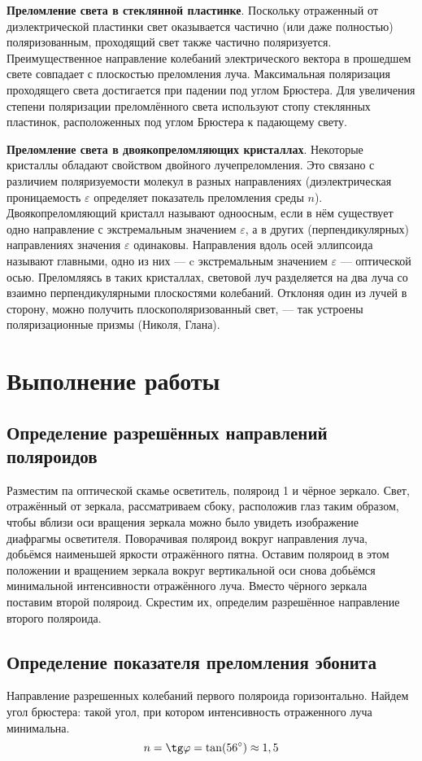 \documentclass[a4paper, 12pt]{article}
\begin{document}
	\textbf{Преломление света в стеклянной пластинке}. Поскольку отраженный от
	диэлектрической пластинки свет оказывается частично (или даже полностью) поляризованным, проходящий свет также частично поляризуется. Преимущественное направление колебаний электрического вектора
	в прошедшем свете совпадает с плоскостью преломления луча. Максимальная поляризация проходящего света достигается при падении под
	углом Брюстера. Для увеличения степени поляризации преломлённого
	света используют стопу стеклянных пластинок, расположенных под углом Брюстера к падающему свету.
	
	\textbf{Преломление света в двоякопреломляющих кристаллах}. Некоторые кристаллы обладают свойством двойного лучепреломления. Это связано с различием поляризуемости молекул в разных направлениях (диэлектрическая проницаемость $\varepsilon$ определяет показатель преломления среды $n$).
	Двоякопреломляющий кристалл называют одноосным, если в нём существует одно направление с экстремальным значением $\varepsilon$, а в других (перпендикулярных) направлениях значения $\varepsilon$ одинаковы. Направления вдоль осей эллипсоида называют главными, одно из них --- c экстремальным значением $\varepsilon$ --- оптической осью. Преломляясь в таких кристаллах, световой луч разделяется на два луча со взаимно перпендикулярными плоскостями колебаний. Отклоняя	один из лучей в сторону, можно получить плоскополяризованный свет, --- так устроены поляризационные призмы (Николя, Глана).

\section{Выполнение работы}
\subsection{Определение разрешённых направлений поляроидов}
Разместим па оптической скамье осветитель, поляроид 1 и чёрное зеркало. Свет, отражённый от зеркала, рассматриваем сбоку, расположив глаз таким образом, чтобы вблизи оси вращения зеркала можно было увидеть изображение диафрагмы осветителя. Поворачивая поляроид вокруг направления луча, добьёмся наименьшей яркости отражённого пятна. Оставим поляроид в этом положении и вращением зеркала вокруг вертикальной оси снова добьёмся минимальной интенсивности отражённого луча.
Вместо чёрного зеркала поставим второй поляроид. Скрестим их, определим разрешённое направление второго поляроида.

\subsection{Определение показателя преломления эбонита}
Направление разрешенных колебаний первого поляроида горизонтально. Найдем угол брюстера: такой угол, при котором интенсивность отраженного луча минимальна.
\begin{equation}
	n = \tg \varphi = \tan (56^\circ) \approx 1,5
\end{equation}
\end{document}

